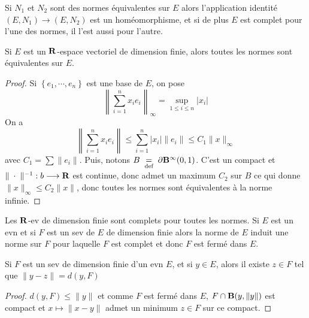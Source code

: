\begin{rem}
    Si $N_1$ et  $N_2$ sont des normes équivalentes sur $E$ alors l'application identité  $(E, N_1)\longrightarrow (E, N_2)$ est un homéomorphisme, et si de plus $E$ est complet pour l'une des normes, il l'est aussi pour l'autre.
\end{rem}

\begin{thm}
Si $E$ est un  $\mathbf R$-espace vectoriel de dimension finie, alors toutes les normes sont équivalentes sur $E$.
\end{thm}

\begin{proof}
    Si $\left\{ e_1, \cdots , e_n \right\} $ est une base de $E$, on pose  \[
        \left\|\sum_{i=1}^nx_ie_i\right\|_\infty=\sup_{1\leq i\leq n} |x_i|
    \]
    On a \[
    \left\|\sum_{i=1}^nx_ie_i\right\|\leq \sum_{i=1}^n |x_i| \|e_i\|\leq C_1 \|x\|_\infty
    \] 
    avec $C_1=\sum \|e_i\|$. Puis, notons $B\;\underset{\text{def}}=\;\partial \mathbf B^\infty(0, 1)$. C'est un compact et $\|\;\cdot\;\|^{-1}:b\longrightarrow \mathbf R$ est continue, donc admet un maximum $C_2$ sur $B$ ce qui donne $\|x\|_\infty\leq C_2\|x\|$, donc toutes les normes sont équivalentes à la norme infinie.
\end{proof}

\begin{rem}
Les $\mathbf R$-ev de dimension finie sont complets pour toutes les normes. Si $E$ est un evn et si  $F$ est un sev de  $E$ de dimension finie alors la norme de  $E$ induit une norme sur  $F$ pour laquelle  $F$ est complet et donc  $F$ est fermé dans  $E$.
\end{rem}

\begin{lmm}
    Si $F$ est un sev de dimension finie d'un evn  $E$, et si  $y \in  E$, alors il existe $z \in  F$ tel que $\|y-z\|=d(y,F)$
\end{lmm}

\begin{proof}
    $d(y, F)\leq  \|y\|$ et comme $F$ est fermé dans  $E$,  $F\cap \mathbf B(y, \|y\|)$ est compact et $x\longmapsto  \|x-y\|$ admet un minimum $z \in F$ sur ce compact.
\end{proof}

